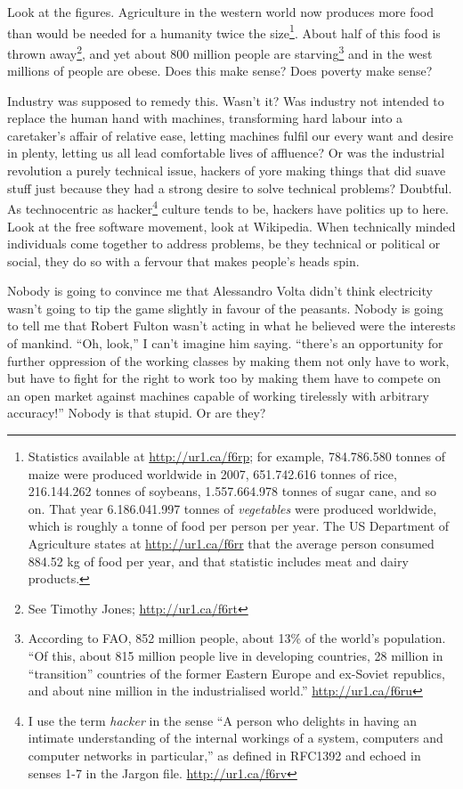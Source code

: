 Look at the f\hbox{}igures. Agriculture in the western world now produces more
food than would be needed for a humanity twice the size\footnote{Statistics
available at \url{http://ur1.ca/f6rp}; for example, 784.786.580 tonnes of maize
were produced worldwide in 2007, 651.742.616 tonnes of rice, 216.144.262 tonnes
of soybeans, 1.557.664.978 tonnes of sugar cane, and so on. That year
6.186.041.997 tonnes of \textit{vegetables} were produced worldwide, which is
roughly a tonne of food per person per year. The US Department of Agriculture
states at \url{http://ur1.ca/f6rr} that the average person consumed 884.52 kg
of food per year, and that statistic includes meat and dairy products.}. About
half of this food is thrown away\footnote{See Timothy Jones;
\url{http://ur1.ca/f6rt}}, and yet about 800 million people are
starving\footnote{According to FAO, 852 million people, about 13\% of the
world's population. ``Of this, about 815 million people live in developing
countries, 28 million in ``transition'' countries of the former Eastern Europe
and ex-Soviet republics, and about nine million in the industrialised world.''
\url{http://ur1.ca/f6ru}} and in the west millions of people are obese. Does
this make sense? Does poverty make sense?

Industry was supposed to remedy this. Wasn't it? Was industry not intended to
replace the human hand with machines, transforming hard labour into a
caretaker's af\hbox{}fair of relative ease, letting machines fulf\hbox{}il our
every want and desire in plenty, letting us all lead comfortable lives of
af\hbox{}f\hbox{}luence? Or was the industrial revolution a purely technical
issue, hackers of yore making things that did suave stuf\hbox{}f just because
they had a strong desire to solve technical problems? Doubtful. As 
technocentric as hacker\footnote{I use the term \textit{hacker} in the sense 
``A person who delights in having an intimate understanding of the internal
workings of a system, computers and computer networks in particular,'' as
def\hbox{}ined in RFC1392 and echoed in senses 1-7 in the Jargon f\hbox{}ile.
\url{http://ur1.ca/f6rv}} culture tends to be, hackers have politics up to 
here. Look at the free software movement, look at Wikipedia.  When technically
minded individuals come together to address problems, be they technical or
political or social, they do so with a fervour that makes people's heads spin.

Nobody is going to convince me that Alessandro Volta didn't think electricity
wasn't going to tip the game slightly in favour of the peasants. Nobody is 
going to tell me that Robert Fulton wasn't acting in what he believed were the
interests of mankind. ``Oh, look,'' I can't imagine him saying. ``there's an
opportunity for further oppression of the working classes by making them not
only have to work, but have to f\hbox{}ight for the right to work too by making
them have to compete on an open market against machines capable of working
tirelessly with arbitrary accuracy!'' Nobody is that stupid. Or are they?

